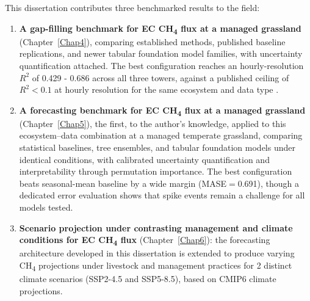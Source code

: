This dissertation contributes three benchmarked results to the field:

\begin{enumerate}
    \item \textbf{A gap-filling benchmark for EC CH\textsubscript{4} flux at a managed
    grassland} (Chapter~\ref{Chap4}), comparing established methods, published baseline
    replications, and newer tabular foundation model families, with uncertainty quantification
    attached. The best configuration reaches an hourly-resolution $R^2$ of 0.429 - 0.686 across all
    three towers, against a published ceiling of $R^2<0.1$ at hourly resolution for the same
    ecosystem and data type \cite{zhu2023a}.

    \item \textbf{A forecasting benchmark for EC CH\textsubscript{4} flux at a managed grassland}
    (Chapter~\ref{Chap5}), the first, to the author's knowledge, applied to this ecosystem--data
    combination at a managed temperate grassland, comparing statistical baselines, tree ensembles, and
    tabular foundation models under identical conditions, with calibrated uncertainty quantification and
    interpretability through permutation importance. The best configuration beats seasonal-mean baseline 
    by a wide margin (MASE$=$0.691), though a dedicated error evaluation shows that spike events remain 
    a challenge for all models tested.

    \item \textbf{Scenario projection under contrasting management and climate conditions for EC CH\textsubscript{4} flux}
    (Chapter~\ref{Chap6}): the forecasting architecture developed in this dissertation is extended
    to produce varying CH\textsubscript{4} projections under livestock and management practices for 
    2 distinct climate scenarios (SSP2-4.5 and SSP5-8.5), based on CMIP6 climate projections.
\end{enumerate}

